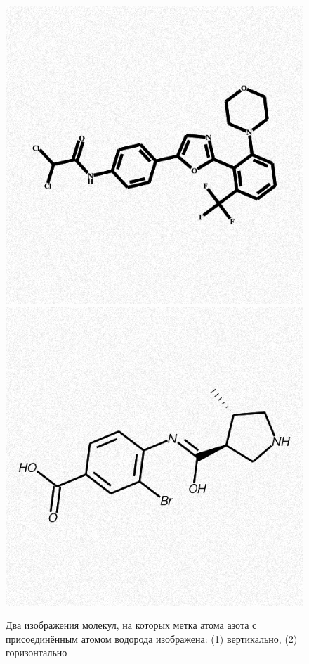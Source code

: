 \begin{figure}[ht!] 
	\center
	\includegraphics [scale=0.45] {my_folder/images/nh_vert}
	\includegraphics [scale=0.45] {my_folder/images/nh_hor}
	\caption{Два изображения молекул, на которых метка атома азота с присоединённым атомом водорода изображена: (1) вертикально, (2) горизонтально} 
	\label{fig:nh}  
\end{figure}

